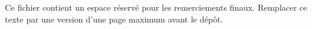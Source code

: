 Ce fichier contient un espace r\'eserv\'e pour les remerciements finaux. Remplacer ce texte par une version d'une page maximum avant le d\'ep\^ot.
